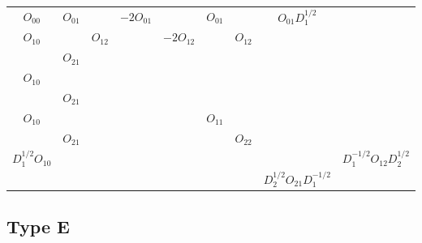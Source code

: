 \begin{tabular}{ccc|cc|cc|cc}
    $O_{00}$               & $O_{01} $   &             & $-2  O_{01}$ &                & $ O_{01}$ &             & $ O_{01}  D_1^{1/2}$           &                                \\
    ${O_{10}}$             &             & ${ O_{12}}$ &              & $-2 { O_{12}}$ &           & ${ O_{12}}$ &                                &                                \\
                           & ${ O_{21}}$ &             &              &                &           &             &                                &                                \\
    \hline
    ${O_{10}}$             &             &             &              &                &           &             &                                &                                \\
                           & ${ O_{21}}$ &             &              &                &           &             &                                &                                \\
    \hline
    ${ O_{10}}$            &             &             &              &                & $O_{11}$  &             &                                &                                \\
                           & ${ O_{21}}$ &             &              &                &           & $O_{22}$    &                                &                                \\
    \hline
    $ D_1^{1/2} { O_{10}}$ &             &             &              &                &           &             &                                & $D_1^{-1/2} O_{12}  D_2^{1/2}$ \\
                           &             &             &              &                &           &             & $ D_2^{1/2} O_{21} D_1^{-1/2}$                                  \\\end{tabular}

\subsection{Type E}

